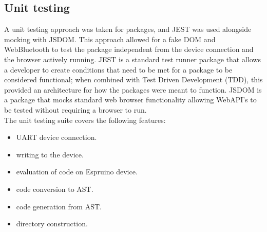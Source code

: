 \documentclass{l4proj}
\begin{document}
\subsection{Unit testing}
A unit testing approach was taken for packages, and JEST was used alongside mocking with JSDOM. This approach allowed for a fake DOM and WebBluetooth to test the package independent from the device connection and the browser actively running. JEST is a standard test runner package that allows a developer to create conditions that need to be met for a package to be considered functional; when combined with Test Driven Development (TDD), this provided an architecture for how the packages were meant to function. JSDOM is a package that mocks standard web browser functionality allowing WebAPI's to be tested without requiring a browser to run.
\\
The unit testing suite covers the following features:
\begin{itemize}
    \item UART device connection.
    \item writing to the device.
    \item evaluation of code on Espruino device.
    \item code conversion to AST.
    \item code generation from AST.
    \item directory construction.

\end{itemize}
\end{document}
